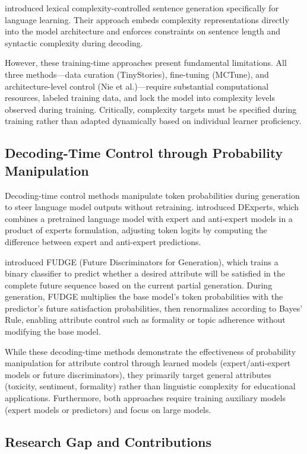 \documentclass[10pt, a4paper]{article}
\begin{document}
\citet{nie2023lexical} introduced lexical complexity-controlled sentence generation specifically for language learning. Their approach embeds complexity representations directly into the model architecture and enforces constraints on sentence length and syntactic complexity during decoding.

However, these training-time approaches present fundamental limitations. All three methods—data curation (TinyStories), fine-tuning (MCTune), and architecture-level control (Nie et al.)—require substantial computational resources, labeled training data, and lock the model into complexity levels observed during training. Critically, complexity targets must be specified during training rather than adapted dynamically based on individual learner proficiency.

\subsection{Decoding-Time Control through Probability Manipulation}

Decoding-time control methods manipulate token probabilities during generation to steer language model outputs without retraining. \citet{liu2021dexperts} introduced DExperts, which combines a pretrained language model with expert and anti-expert models in a product of experts formulation, adjusting token logits by computing the difference between expert and anti-expert predictions.

\citet{yang2021fudge} introduced FUDGE (Future Discriminators for Generation), which trains a binary classifier to predict whether a desired attribute will be satisfied in the complete future sequence based on the current partial generation. During generation, FUDGE multiplies the base model's token probabilities with the predictor's future satisfaction probabilities, then renormalizes according to Bayes' Rule, enabling attribute control such as formality or topic adherence without modifying the base model.

While these decoding-time methods demonstrate the effectiveness of probability manipulation for attribute control through learned models (expert/anti-expert models or future discriminators), they primarily target general attributes (toxicity, sentiment, formality) rather than linguistic complexity for educational applications. Furthermore, both approaches require training auxiliary models (expert models or predictors) and focus on large models.

\subsection{Research Gap and Contributions}
\end{document}
